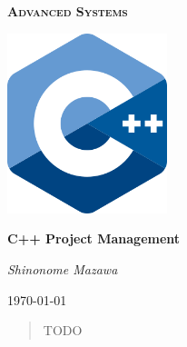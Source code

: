 \documentclass[a4paper]{article}
\begin{document}
\begin{titlepage}
    \centering
    {\scshape\Huge \bfseries{Advanced Systems} \par}
    \par\vspace{1cm}
    \includegraphics[width=0.35\textwidth]{images/cpp-logo.png}\par
    \vspace{3cm}
    {\huge\bfseries C++ Project Management \par}
    \vspace{1cm}
    {\LARGE\itshape Shinonome Mazawa \par}
    \vspace{1cm}
    {\large\today\par}
    \vfill
    \begin{abstract}
        TODO
    \end{abstract}
\end{titlepage}

\newpage

\tableofcontents
{}

\newpage




% 



% 

% 



% 

% 

% 

% 


\newpage

\medskip
\printbibliography
\end{document}
